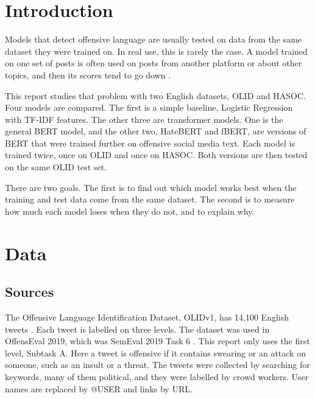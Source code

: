 \documentclass[11pt,a4paper]{article}
\begin{document}
\section{Introduction}

Models that detect offensive language are usually tested on data from the same dataset they were trained on. In real use, this is rarely the case. A model trained on one set of posts is often used on posts from another platform or about other topics, and then its scores tend to go down \citep{swamy2019studying,fortuna2021how}.

This report studies that problem with two English datasets, OLID and HASOC. Four models are compared. The first is a simple baseline, Logistic Regression with TF-IDF features. The other three are transformer models. One is the general BERT model, and the other two, HateBERT and fBERT, are versions of BERT that were trained further on offensive social media text. Each model is trained twice, once on OLID and once on HASOC. Both versions are then tested on the same OLID test set.

There are two goals. The first is to find out which model works best when the training and test data come from the same dataset. The second is to measure how much each model loses when they do not, and to explain why.

\section{Data}

\subsection{Sources}

The Offensive Language Identification Dataset, OLIDv1, has 14,100 English tweets \citep{zampieri2019olid}. Each tweet is labelled on three levels. The dataset was used in OffensEval 2019, which was SemEval 2019 Task 6 \citep{zampieri2019semeval}. This report only uses the first level, Subtask A. Here a tweet is offensive if it contains swearing or an attack on someone, such as an insult or a threat. The tweets were collected by searching for keywords, many of them political, and they were labelled by crowd workers. User names are replaced by @USER and links by URL.
\end{document}
